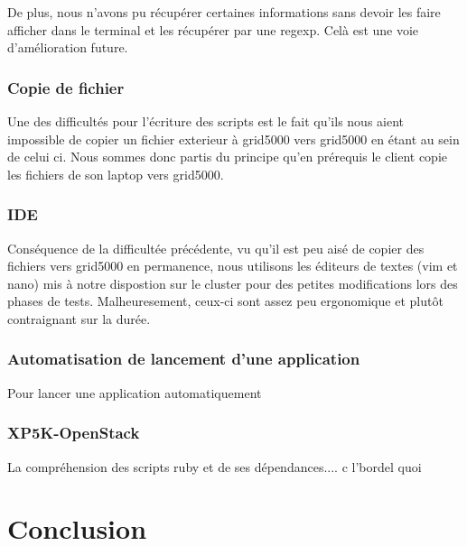 \documentclass{report}
\begin{document}
            De plus, nous n'avons pu récupérer certaines informations sans devoir les faire afficher dans le terminal et les récupérer par une regexp. Celà est une voie d'amélioration future.\bigbreak
            
        \subsection{Copie de fichier}
            Une des difficultés pour l'écriture des scripts est le fait qu'ils nous aient impossible de copier un fichier exterieur à grid5000 vers grid5000 en étant au sein de celui ci. Nous sommes donc partis du principe qu'en prérequis le client copie les fichiers de son laptop vers grid5000.\bigbreak
        
        \subsection{IDE}
            Conséquence de la difficultée précédente, vu qu'il est peu aisé de copier des fichiers vers grid5000 en permanence, nous utilisons les éditeurs de textes (vim et nano) mis à notre dispostion sur le cluster pour des petites modifications lors des phases de tests. Malheuresement, ceux-ci sont assez peu ergonomique et plutôt contraignant sur la durée.\bigbreak
            
        \subsection{Automatisation de lancement d'une application}
            Pour lancer une application automatiquement
            
        \subsection{XP5K-OpenStack}
            La compréhension des scripts ruby et de ses dépendances.... c l'bordel quoi
            
            
            
            
\newpage
\chapter*{Conclusion}
 

\newpage
\end{document}
